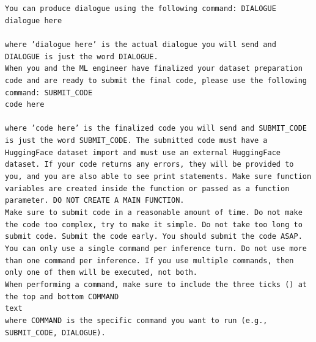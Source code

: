 \documentclass[11pt, a4paper]{gdm_format}
\begin{document}
\begin{tcolorbox}[breakable,colback=orange!5!white, colframe=orange!80!black, title=PhD Student Data Preparation Command Prompt]
\texttt{You can produce dialogue using the following command: \textasciigrave\textasciigrave\textasciigrave DIALOGUE\\dialogue here\\ \textasciigrave\textasciigrave\textasciigrave \\ where 'dialogue here' is the actual dialogue you will send and DIALOGUE is just the word DIALOGUE.\\When you and the ML engineer have finalized your dataset preparation code and are ready to submit the final code, please use the following command: \textasciigrave\textasciigrave\textasciigrave SUBMIT\_CODE\\code here\\\textasciigrave\textasciigrave\textasciigrave\\ where 'code here' is the finalized code you will send and SUBMIT\_CODE is just the word SUBMIT\_CODE. The submitted code must have a HuggingFace dataset import and must use an external HuggingFace dataset. If your code returns any errors, they will be provided to you, and you are also able to see print statements.  Make sure function variables are created inside the function or passed as a function parameter. DO NOT CREATE A MAIN FUNCTION.\\Make sure to submit code in a reasonable amount of time. Do not make the code too complex, try to make it simple. Do not take too long to submit code. Submit the code early. You should submit the code ASAP.\\You can only use a single command per inference turn. Do not use more than one command per inference. If you use multiple commands, then only one of them will be executed, not both.\\When performing a command, make sure to include the three ticks (\textasciigrave\textasciigrave\textasciigrave) at the top and bottom \textasciigrave\textasciigrave\textasciigrave COMMAND\\text\\\textasciigrave\textasciigrave\textasciigrave where COMMAND is the specific command you want to run (e.g., SUBMIT\_CODE, DIALOGUE).}
\end{tcolorbox}
\end{document}
